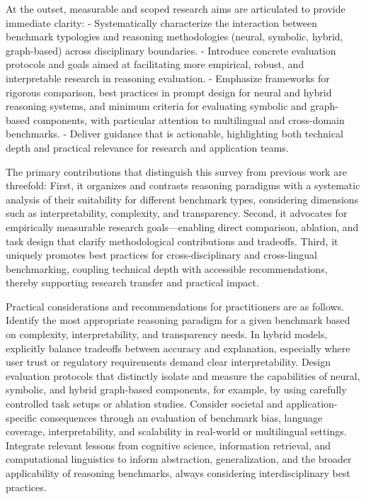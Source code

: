 \documentclass[sigconf]{acmart}
\begin{document}
At the outset, measurable and scoped research aims are articulated to provide immediate clarity:
- Systematically characterize the interaction between benchmark typologies and reasoning methodologies (neural, symbolic, hybrid, graph-based) across disciplinary boundaries.
- Introduce concrete evaluation protocols and goals aimed at facilitating more empirical, robust, and interpretable research in reasoning evaluation.
- Emphasize frameworks for rigorous comparison, best practices in prompt design for neural and hybrid reasoning systems, and minimum criteria for evaluating symbolic and graph-based components, with particular attention to multilingual and cross-domain benchmarks.
- Deliver guidance that is actionable, highlighting both technical depth and practical relevance for research and application teams.

The primary contributions that distinguish this survey from previous work are threefold: First, it organizes and contrasts reasoning paradigms with a systematic analysis of their suitability for different benchmark types, considering dimensions such as interpretability, complexity, and transparency. Second, it advocates for empirically measurable research goals—enabling direct comparison, ablation, and task design that clarify methodological contributions and tradeoffs. Third, it uniquely promotes best practices for cross-disciplinary and cross-lingual benchmarking, coupling technical depth with accessible recommendations, thereby supporting research transfer and practical impact.

Practical considerations and recommendations for practitioners are as follows.
Identify the most appropriate reasoning paradigm for a given benchmark based on complexity, interpretability, and transparency needs.
In hybrid models, explicitly balance tradeoffs between accuracy and explanation, especially where user trust or regulatory requirements demand clear interpretability.
Design evaluation protocols that distinctly isolate and measure the capabilities of neural, symbolic, and hybrid graph-based components, for example, by using carefully controlled task setups or ablation studies.
Consider societal and application-specific consequences through an evaluation of benchmark bias, language coverage, interpretability, and scalability in real-world or multilingual settings.
Integrate relevant lessons from cognitive science, information retrieval, and computational linguistics to inform abstraction, generalization, and the broader applicability of reasoning benchmarks, always considering interdisciplinary best practices.
\end{document}
